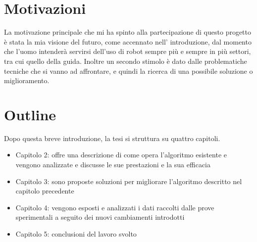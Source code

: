 \section{Motivazioni}
	La motivazione principale che mi ha spinto alla partecipazione di questo progetto è stata la mia visione del futuro, come accennato nell' introduzione, dal momento che l'uomo intenderà servirsi dell'uso di robot sempre più e sempre in più settori, tra cui quello della guida. Inoltre un secondo stimolo è dato dalle problematiche tecniche che si vanno ad affrontare, e quindi la ricerca di una possibile soluzione o miglioramento.

\section{Outline}
	Dopo questa breve introduzione, la tesi si struttura su quattro capitoli.
	\begin{itemize}
		\item Capitolo 2: offre una descrizione di come opera l'algoritmo esistente e vengono analizzate e discusse le sue prestazioni e la sua efficacia
		\item Capitolo 3: sono proposte soluzioni per migliorare l'algoritmo descritto nel capitolo precedente
		\item Capitolo 4: vengono esposti e analizzati i dati raccolti dalle prove sperimentali a seguito dei nuovi cambiamenti introdotti
		\item Capitolo 5: conclusioni del lavoro svolto
	\end{itemize}
	
















